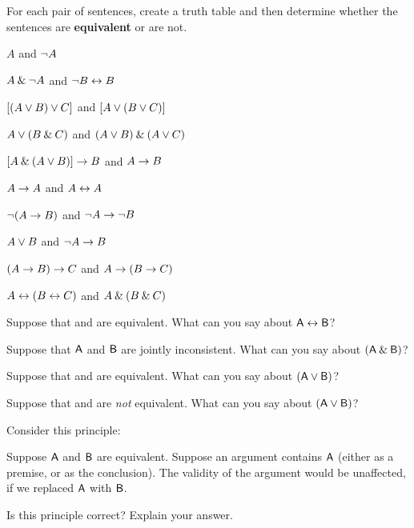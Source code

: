\problempart
\label{pr.TT.equiv}
For each pair of sentences, create a truth table and then determine whether the sentences are \textbf{equivalent} or are not. 
\begin{earg}
\item $A$ and ${\neg} A$
\item $A \mathbin{\&} {\neg} A$ and ${\neg} B \leftrightarrow B$
\item $[(A \vee B) \vee C]$ and $[A \vee (B \vee C)]$
\item $A \vee (B \mathbin{\&} C)$ and $(A \vee B) \mathbin{\&} (A \vee C)$
\item $[A \mathbin{\&} (A \vee B)] \rightarrow B$ and $A \rightarrow B$


\item $A\rightarrow A$ and $A \leftrightarrow A$
\item ${\neg}(A \rightarrow B)$ and ${\neg} A \rightarrow {\neg} B$
\item $A \vee B$ and ${\neg} A \rightarrow B$
\item$(A \rightarrow B) \rightarrow C$ and $A \rightarrow (B \rightarrow C)$
\item $A \leftrightarrow (B \leftrightarrow C)$ and $A \mathbin{\&} (B \mathbin{\&} C)$
\end{earg}


\problempart
\label{pr.TT.concepts}
\begin{earg}
\item Suppose that  and  are equivalent. What can you say about $\mathsf{A}\leftrightarrow\mathsf{B}$?

\item Suppose that $\mathsf{A}$ and $\mathsf{B}$ are jointly inconsistent. What can you say about $(\mathsf{A}\mathbin{\&}\mathsf{B})$?

\item Suppose that  and  are equivalent. What can you say about $(\mathsf{A}\vee\mathsf{B})$?

\item Suppose that  and  are \emph{not} equivalent. What can you say about $(\mathsf{A}\vee\mathsf{B})$?

\item Consider this principle:
	\begin{ebullet}
		\item[] Suppose $\mathsf{A}$ and $\mathsf{B}$ are equivalent. Suppose an argument contains $\mathsf{A}$ (either as a premise, or as the conclusion). The validity of the argument would be unaffected, if we replaced $\mathsf{A}$ with $\mathsf{B}$.
	\end{ebullet}
Is this principle correct? Explain your answer.
\end{earg}


